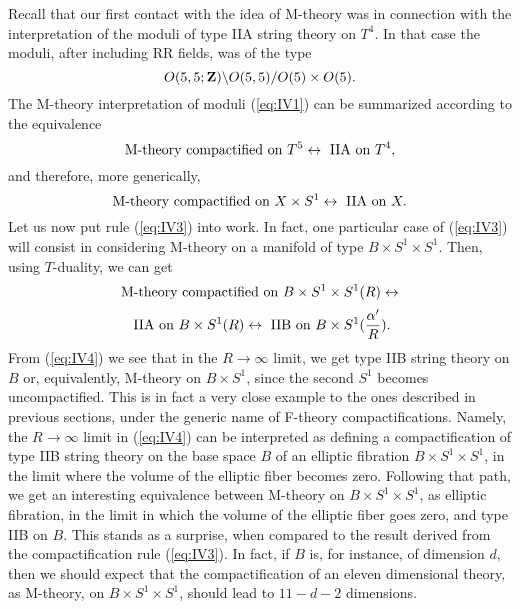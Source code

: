Recall that our first contact with the idea of M-theory was in
connection with the interpretation of the moduli of type IIA string theory on $T^4$. In
that case the moduli, after including RR fields, was of the type
\begin{equation}
O(5,5;{\bf Z}) \backslash O(5,5) / O(5) \times O(5).
\label{eq:IV1}
\end{equation}
The M-theory interpretation of moduli (\ref{eq:IV1}) can be
summarized according to the equivalence
\begin{equation}
\hbox {M-theory compactified on }T^5 \leftrightarrow \hbox{ IIA} \hbox {
on } T^4,
\label{eq:IV2}
\end{equation}
and therefore, more generically,
\begin{equation}
\hbox {M-theory compactified on }X \times S^1 \leftrightarrow \hbox { IIA} \hbox {
on } X.
\label{eq:IV3}
\end{equation}
Let us now put rule (\ref{eq:IV3}) into work. In fact, one
particular case of (\ref{eq:IV3}) will consist in considering
M-theory on a manifold of type $B\times S^1 \times S^1$. Then,
using $T$-duality, we can get
\[
\hbox {M-theory compactified on }B \times S^1 \times S^1(R) \leftrightarrow \]
\begin{equation}
\hbox{ IIA} \hbox {
on } B\times S^1(R) \leftrightarrow \hbox { IIB} \hbox { on } B\times
S^1(\frac {\alpha'}{R}).
\label{eq:IV4}
\end{equation}
From (\ref{eq:IV4}) we see that in the $R \rightarrow \infty$
limit, we get type IIB string theory on $B$ or, equivalently,
M-theory on $B\times S^1$, since the second $S^1$ becomes
uncompactified. This is in fact a very close example to the ones
described in previous sections, under the generic name of
F-theory compactifications. Namely, the $R \rightarrow \infty$
limit in (\ref{eq:IV4}) can be interpreted as defining a
compactification of type IIB string theory on the base space $B$ of an elliptic
fibration $B \times S^1 \times S^1$, in the limit where the
volume of the elliptic fiber becomes zero. Following that path,
we get an interesting equivalence between M-theory on $B\times
S^1 \times S^1$, as elliptic fibration, in the limit in which the
volume of the elliptic fiber goes zero, and type IIB on $B$. This
stands as a surprise, when compared to the result derived from
the compactification rule (\ref{eq:IV3}). In fact, if $B$ is, for
instance, of dimension $d$, then we should expect that the
compactification of an eleven dimensional theory, as M-theory, on
$B\times S^1 \times S^1$, should lead to $11-d-2$ dimensions.
